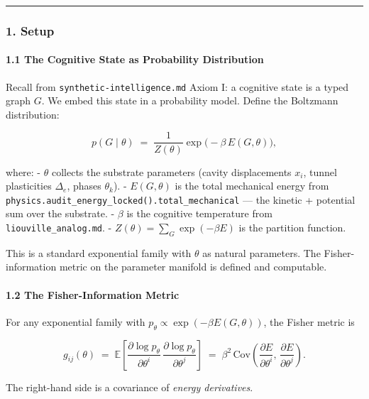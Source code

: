 \documentclass[
  11pt,
  a4paper,
]{article}
\begin{document}
\begin{center}\rule{0.5\linewidth}{0.5pt}\end{center}

\subsubsection{1. Setup}\label{setup-1}

\paragraph{1.1 The Cognitive State as Probability
Distribution}\label{the-cognitive-state-as-probability-distribution}

Recall from \texttt{synthetic-intelligence.md} Axiom I: a cognitive
state is a typed graph \(G\). We embed this state in a probability
model. Define the Boltzmann distribution:

\[
p(G \mid \theta) \;=\; \frac{1}{Z(\theta)} \exp\!\big(-\beta \, E(G, \theta)\big),
\]

where: - \(\theta\) collects the substrate parameters (cavity
displacements \(x_i\), tunnel plasticities \(\Delta_e\), phases
\(\theta_k\)). - \(E(G, \theta)\) is the total mechanical energy from
\texttt{physics.audit\_energy\_locked().total\_mechanical} --- the
kinetic + potential sum over the substrate. - \(\beta\) is the cognitive
temperature from \texttt{liouville\_analog.md}. -
\(Z(\theta) = \sum_G \exp(-\beta E)\) is the partition function.

This is a standard exponential family with \(\theta\) as natural
parameters. The Fisher-information metric on the parameter manifold is
defined and computable.

\paragraph{1.2 The Fisher-Information
Metric}\label{the-fisher-information-metric}

For any exponential family with
\(p_\theta \propto \exp(-\beta E(G, \theta))\), the Fisher metric is

\[
g_{ij}(\theta) \;=\; \mathbb{E}\!\left[ \frac{\partial \log p_\theta}{\partial \theta^i} \, \frac{\partial \log p_\theta}{\partial \theta^j} \right]
\;=\; \beta^2 \, \mathrm{Cov}\!\left(\frac{\partial E}{\partial \theta^i}, \, \frac{\partial E}{\partial \theta^j}\right).
\]

The right-hand side is a covariance of \emph{energy derivatives}.
\end{document}
